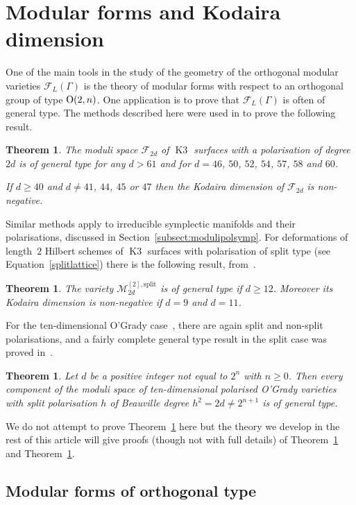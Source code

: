 \documentclass[a4paper,11pt]{article}
\newtheorem{theorem}[lemma]{Theorem}
\newcommand{\cF}{\mathcal F}
\newcommand{\cM}{\mathcal M}
\newcommand{\Orth}{\mathop{\null\mathrm {O}}\nolimits}
\newcommand{\Kthree}{\mathop{\mathrm {K3}}\nolimits}
\begin{document}
\section{Modular forms and Kodaira dimension}\label{sect:modforms}

One of the main tools in the study of the geometry of the orthogonal
modular varieties $\cF_L(\Gamma)$ is the theory of modular forms with
respect to an orthogonal group of type $\Orth(2,n)$. One application
is to prove that $\cF_L(\Gamma)$ is often of general type.  The
methods described here were used in \cite{GHSK3} to prove the
following result.
\begin{theorem}\label{thm:K3gt}
  The moduli space $\cF_{2d}$ of $\Kthree$ surfaces with a
  polarisation of degree $2d$ is of general type for any $d>61$ and
  for $d=46$, $50$, $52$, $54$, $57$, $58$ and $60$.

  If $d\ge 40$ and $d\ne 41$, $44$, $45$ or $47$ then the Kodaira
  dimension of $\cF_{2d}$ is non-negative.
\end{theorem}
Similar methods apply to irreducible symplectic manifolds and their
polarisations, discussed in Section~\ref{subsect:modulipolsymp}. For
deformations of length~$2$ Hilbert schemes of $\Kthree$ surfaces with
polarisation of split type (see Equation~\eqref{splitlattice}) there is
the following result, from~\cite{GHSsymp}.
\begin{theorem}\label{thm:splitgt}
  The variety $\cM^{[2],\text{split}}_{2d}$ is of general type if $d\ge
  12$.  Moreover its Kodaira dimension is non-negative if $d=9$ and
  $d=11$.
\end{theorem}
For the ten-dimensional O'Grady case~\cite{OG1}, there are again split
and non-split polarisations, and a fairly complete general type result
in the split case was proved in~\cite{GHSdim21}.
\begin{theorem}\label{thm:21gt}
Let $d$ be a positive integer not equal to $2^n$ with $n\ge 0$.  Then
every component of the moduli space of ten-dimensional polarised
O'Grady varieties with split polarisation $h$ of Beauville degree
$h^2=2d\ne 2^{n+1}$ is of general type.
\end{theorem}
We do not attempt to prove Theorem~\ref{thm:21gt} here but the theory
we develop in the rest of this article will give proofs (though not
with full details) of Theorem~\ref{thm:K3gt} and Theorem~\ref{thm:splitgt}.

\subsection{Modular forms of orthogonal type}\label{subsect:orthmodfms}
\end{document}
